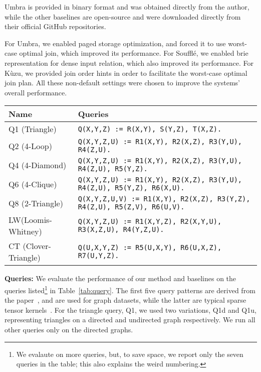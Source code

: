 Umbra is provided in binary format and was obtained directly from the author, while the other baselines are open-source and were downloaded directly from their official GitHub repositories.

For Umbra, we enabled paged storage optimization, and forced it to use worst-case optimal join, which improved its performance. For Soufflé, we enabled brie representation for dense input relation, which also improved its performance. For Kùzu, we provided join order hints in order to facilitate the worst-case optimal join plan. All these non-default settings were chosen to improve the systems' overall performance. 

{
\begin{table*}[t]
	\centering
	\caption{Table of Queries}
	\label{tab:query}
	\begin{tabular}{ll}  
	\toprule
	\textbf{Name} & \textbf{Queries} \\ 
	\midrule
	Q1 (Triangle) & \texttt{Q(X,Y,Z) := R(X,Y), S(Y,Z), T(X,Z).}
	 \\ 
	\hline
	Q2 (4-Loop) & \texttt{Q(X,Y,Z,U) := R1(X,Y), R2(X,Z), R3(Y,U), R4(Z,U).} \\ 
	\hline
	Q4 (4-Diamond) & \texttt{Q(X,Y,Z,U) := R1(X,Y), R2(X,Z), R3(Y,U), R4(Z,U), R5(Y,Z).} \\ 
	\hline
	Q6 (4-Clique) & \texttt{Q(X,Y,Z,U) := R1(X,Y), R2(X,Z), R3(Y,U), R4(Z,U), R5(Y,Z), R6(X,U).} \\ 
	\hline
	Q8 (2-Triangle) & \texttt{Q(X,Y,Z,U,V) := R1(X,Y), R2(X,Z), R3(Y,Z), R4(Z,U), R5(Z,V), R6(U,V).}\\ 
	\hline
	\hline
	LW(Loomis-Whitney) \!\!\!& \texttt{Q(X,Y,Z,U) := R1(X,Y,Z), R2(X,Y,U), R3(X,Z,U), R4(Y,Z,U).}\\
	\hline
	CT (Clover-Triangle) & \texttt{Q(U,X,Y,Z) := R5(U,X,Y), R6(U,X,Z), R7(U,Y,Z).} \\
	\bottomrule
	\end{tabular}
\end{table*}
}

\addvspace{\smallskipamount}
\noindent\textbf{Queries:} We evaluate the performance of our method and baselines on the queries listed\footnote{We evalaute on more queries, but, to save space, we report only the seven queries in the table; this also explains the weird numbering.} in Table~\ref{tab:query}.  The first five query patterns are derived from the paper~\cite{DBLP:journals/pvldb/MhedhbiS19}, and are used for graph datasets, while the latter are typical sparse tensor kernels~\cite{DBLP:journals/pacmpl/KjolstadKCLA17}. For the triangle query, Q1, we used two variations, Q1d and Q1u, representing triangles on a directed and undirected graph respectively.  We run all other queries only on the directed graphs.

